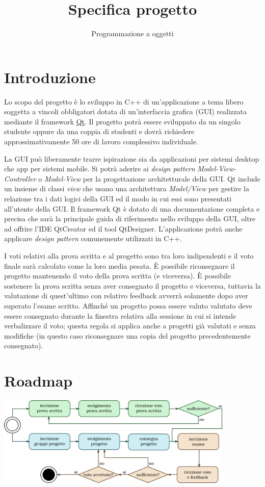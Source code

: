 \documentclass[10pt,a4paper,oneside]{article}
\title{Specifica progetto}
\author{Programmazione a oggetti}
\begin{document}
\maketitle

\section{Introduzione}
Lo scopo del progetto è lo sviluppo in C++ di un'applicazione a tema libero soggetta a vincoli obbligatori dotata di un'interfaccia grafica (GUI) realizzata mediante il framework \href{https://www.qt.io/?hsLang=en}{Qt}. Il progetto potrà essere sviluppato da un singolo studente oppure da una coppia di studenti e dovrà richiedere approssimativamente 50 ore di lavoro complessivo individuale.

La GUI può liberamente trarre ispirazione sia da applicazioni per sistemi desktop che app per sistemi mobile. Si potrà aderire ai \emph{design pattern} \emph{Model-View-Controller} o \emph{Model-View} per la progettazione architetturale della GUI. Qt include un insieme di classi \emph{view} che usano una architettura \emph{Model/View} per gestire la relazione tra i dati logici della GUI ed il modo in cui essi sono presentati all'utente della GUI. Il framework Qt è dotato di una documentazione completa e precisa che sarà la principale guida di riferimento nello sviluppo della GUI, oltre ad offrire l'IDE QtCreator ed il tool QtDesigner. L'applicazione potrà anche applicare \emph{design pattern} comunemente utilizzati in C++.

I voti relativi alla prova scritta e al progetto sono tra loro indipendenti e il voto finale sarà calcolato come la loro media pesata. È possibile riconsegnare il progetto mantenendo il voto della prova scritta (e viceversa). È possibile sostenere la prova scritta senza aver consegnato il progetto e viceversa, tuttavia la valutazione di quest'ultimo con relativo feedback avverrà solamente dopo aver superato l'esame scritto. Affinché un progetto possa essere valuto valutato deve essere consegnato durante la finestra relativa alla sessione in cui si intende verbalizzare il voto; questa regola si applica anche a progetti già valutati e senza modifiche (in questo caso riconsegnare una copia del progetto precedentemente consegnato).

\section{Roadmap}
\begin{center}
 \includegraphics[width=0.85\textwidth]{assets/roadmap}
\end{center}
\end{document}

